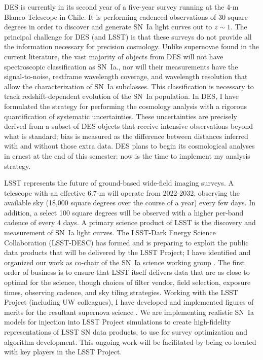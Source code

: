 \documentclass{article}
\begin{document}
DES is currently in its second year of a five-year survey running at the 4-m Blanco Telescope in Chile.  It is performing
cadenced observations of 30 square degrees in order to discover and generate SN~Ia light curves out
to $z\sim1$.
The principal challenge for DES (and LSST) is that these surveys do
not provide all the information necessary for precision cosmology.
Unlike  supernovae found in the current literature, the vast majority of objects from DES
will not have spectroscopic classification as SN~Ia., nor will their
measurements have the signal-to-noise, restframe wavelength coverage, and wavelength resolution that allow 
the characterization of SN~Ia subclasses.  This classification is necessary to track redshift-dependent evolution of 
the SN~Ia population.  In DES, I have formulated the strategy for performing the cosmology analysis
with a rigorous quantification of systematic uncertainties.  These uncertainties are precisely derived from a subset of 
DES objects that receive intensive observations beyond what is standard;
bias is measured as the difference between distances inferred with
and without those extra data. 
DES plans to begin its cosmological analyses in ernest at the end
of this semester: now is the time to implement my analysis strategy.

LSST  represents the future of ground-based wide-field imaging surveys.
A telescope with an effective 6.7-m will operate from 2022-2032, observing the available sky (18,000 square degrees over the course
of a year)
every few days.  In addition, a select 100 square degrees will be observed with a higher per-band cadence of every 4 days.
A primary science product of LSST is the discovery and measurement of SN~Ia light curves.
The LSST-Dark Energy Science Collaboration (LSST-DESC) has formed and is preparing
to exploit  the public data products that will be
delivered by the  LSST Project;  I have identified and organized
our work as co-chair of the SN~Ia science working group \cite{2012arXiv1211.0310L}.
The first order of business is to ensure that LSST itself delivers data that are as close to optimal for the science, though
choices of filter vendor, field selection, exposure times, observing cadence, and sky tiling strategies.
Working with the LSST Project (including UW colleagues), I have developed and implemented figures of merits for the resultant supernova science
\cite{LSSTCadence}.  
We are implementing realistic SN~Ia models for injection into LSST Project simulations to create high-fidelity representations
of LSST SN data products, to use for survey optimization and algorithm development.  This ongoing work will be
facilitated by being co-located with key players in the LSST Project.
\end{document}

